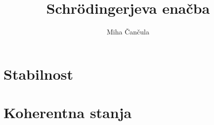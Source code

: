 \documentclass[a4paper,10pt]{article}
\title{Schr\"odingerjeva ena\v cba}
\author{Miha \v Can\v cula}
\begin{document}
\maketitle

\section{Stabilnost}



\section{Koherentna stanja}


\end{document}
